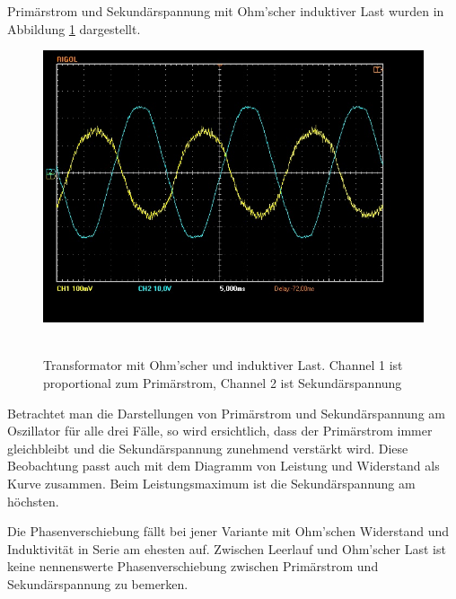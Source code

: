 \documentclass{article}
\begin{document}
Primärstrom und Sekundärspannung mit Ohm’scher induktiver Last wurden in Abbildung \ref{fig:task3} dargestellt.


\begin{figure}[H]
\caption{Transformator mit Ohm'scher und induktiver Last. Channel 1 ist proportional zum Primärstrom, Channel 2 ist Sekundärspannung}
\label{fig:task3}
{\centering
\includegraphics[scale=0.4]{task3.jpg}
~
}
\end{figure}


Betrachtet man die Darstellungen von Primärstrom und Sekundärspannung am Oszillator für alle drei Fälle, so wird ersichtlich, dass der Primärstrom immer gleichbleibt und die Sekundärspannung zunehmend verstärkt wird.
Diese Beobachtung passt auch mit dem Diagramm von Leistung und Widerstand als Kurve zusammen. Beim Leistungsmaximum ist die Sekundärspannung am höchsten.


Die Phasenverschiebung fällt bei jener Variante mit Ohm'schen Widerstand und Induktivität in Serie am ehesten auf. Zwischen Leerlauf und Ohm'scher Last ist keine nennenswerte Phasenverschiebung zwischen Primärstrom und Sekundärspannung zu bemerken.
\end{document}
